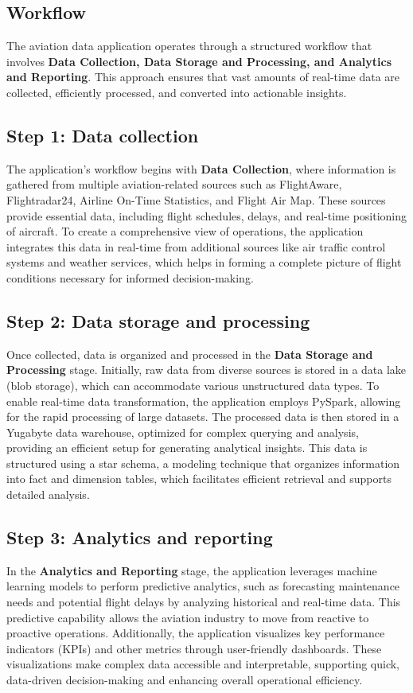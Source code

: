 \documentclass[12pt, a4paper]{article}
\begin{document}
\subsection{Workflow}
The aviation data application operates through a structured workflow that
involves \textbf{Data Collection, Data Storage and Processing, and Analytics and
Reporting}. This approach ensures that vast amounts of real-time data are
collected, efficiently processed, and converted into actionable insights.

\subsection*{Step 1: Data collection}
The application’s workflow begins with \textbf{Data Collection}, where
information is gathered from multiple aviation-related sources such as
FlightAware, Flightradar24, Airline On-Time Statistics, and Flight Air Map.
These sources provide essential data, including flight schedules, delays, and
real-time positioning of aircraft. To create a comprehensive view of operations,
the application integrates this data in real-time from additional sources like
air traffic control systems and weather services, which helps in forming a
complete picture of flight conditions necessary for informed decision-making.

\subsection*{Step 2: Data storage and processing}
Once collected, data is organized and processed in the \textbf{Data Storage and
Processing} stage. Initially, raw data from diverse sources is stored in a data
lake (blob storage), which can accommodate various unstructured data types. To
enable real-time data transformation, the application employs PySpark, allowing
for the rapid processing of large datasets. The processed data is then stored in
a Yugabyte data warehouse, optimized for complex querying and analysis,
providing an efficient setup for generating analytical insights. This data is
structured using a star schema, a modeling technique that organizes information
into fact and dimension tables, which facilitates efficient retrieval and
supports detailed analysis.

\subsection*{Step 3: Analytics and reporting}
In the \textbf{Analytics and Reporting} stage, the application leverages machine
learning models to perform predictive analytics, such as forecasting maintenance
needs and potential flight delays by analyzing historical and real-time data.
This predictive capability allows the aviation industry to move from reactive to
proactive operations. Additionally, the application visualizes key performance
indicators (KPIs) and other metrics through user-friendly dashboards. These
visualizations make complex data accessible and interpretable, supporting quick,
data-driven decision-making and enhancing overall operational efficiency.
\end{document}
